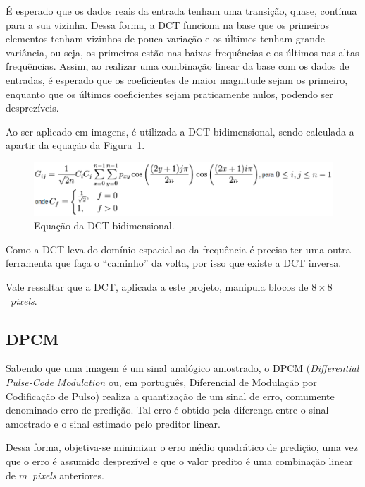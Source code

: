 \documentclass[conference]{Trabalho_3}
\begin{document}
\'E esperado que os dados reais da entrada tenham uma transi\c{c}\~ao, quase, cont\'inua para a sua vizinha. Dessa forma, a DCT funciona na base que os primeiros elementos tenham vizinhos de pouca varia\c{c}\~ao e os \'ultimos tenham grande vari\^ancia, ou seja, os primeiros est\~ao nas baixas frequ\^encias e os \'ultimos nas altas frequ\^encias. Assim, ao realizar uma combina\c{c}\~ao linear da base com os dados de entradas, \'e esperado que os coeficientes de maior magnitude sejam os primeiro, enquanto que os \'ultimos coeficientes sejam praticamente nulos, podendo ser desprez\'iveis.

Ao ser aplicado em imagens, \'e utilizada a DCT bidimensional, sendo calculada a apartir da equa\c{c}\~ao da Figura~\ref{fig:DCT}.

\begin{figure}
  \centering
  \includegraphics[width = 9 cm]{DCT}
  \caption{Equa\c{c}\~ao da DCT bidimensional.}
  \label{fig:DCT}
\end{figure}

Como a DCT leva do dom\'inio espacial ao da frequ\^encia \'e preciso ter uma outra ferramenta que fa\c{c}a o ``caminho'' da volta, por isso que existe a DCT inversa.

Vale ressaltar que a DCT, aplicada a este projeto, manipula blocos de ${8 \times 8}$~\textit{pixels}.

\subsection{DPCM}
  \label{dpcm}
Sabendo que uma imagem \'e um sinal anal\'ogico amostrado, o DPCM  (\textit{Differential Pulse-Code Modulation} ou, em portugu\^es, Diferencial de Modula\c{c}\~ao por Codifica\c{c}\~ao de Pulso) realiza a quantiza\c{c}\~ao de um sinal de erro, comumente denominado erro de predi\c{c}\~ao. Tal erro \'e obtido pela diferen\c{c}a entre o sinal amostrado e o sinal estimado pelo preditor linear.

Dessa forma, objetiva-se minimizar o erro m\'edio quadr\'atico de predi\c{c}\~ao, uma vez que o erro \'e assumido desprez\'ivel e que o valor predito \'e uma combina\c{c}\~ao linear de $m$~\textit{pixels} anteriores.
\end{document}
